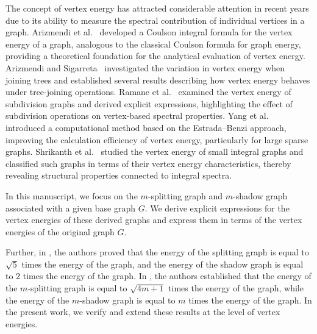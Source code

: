 \documentclass[12pt]{article}
\theoremstyle{plain}
\theoremstyle{remark}
\theoremstyle{definition}
\begin{document}

The concept of vertex energy has attracted considerable attention in recent years due to its ability to measure the spectral contribution of individual vertices in a graph. Arizmendi et al.~\cite{3} developed a Coulson integral formula for the vertex energy of a graph, analogous to the classical Coulson formula for graph energy, providing a theoretical foundation for the analytical evaluation of vertex energy. Arizmendi and Sigarreta~\cite{4} investigated the variation in vertex energy when joining trees and established several results describing how vertex energy behaves under tree-joining operations. Ramane et al.~\cite{5} examined the vertex energy of subdivision graphs and derived explicit expressions, highlighting the effect of subdivision operations on vertex-based spectral properties. Yang et al.~\cite{6} introduced a computational method based on the Estrada--Benzi approach, improving the calculation efficiency of vertex energy, particularly for large sparse graphs. Shrikanth et al.~\cite{7} studied the vertex energy of small integral graphs and classified such graphs in terms of their vertex energy characteristics, thereby revealing structural properties connected to integral spectra.

In this manuscript, we focus on the $m$-splitting graph and $m$-shadow graph associated with a given base graph $G$. We derive explicit expressions for the vertex energies of these derived graphs and express them in terms of the vertex energies of the original graph $G$. 

Further, in \cite{8}, the authors proved that the energy of the splitting graph is equal to $\sqrt{5}$ times the energy of the graph, and the energy of the shadow graph is equal to $2$ times the energy of the graph. In \cite{9}, the authors established that the energy of the $m$-splitting graph is equal to $\sqrt{4m+1}$ times the energy of the graph, while the energy of the $m$-shadow graph is equal to $m$ times the energy of the graph. In the present work, we verify and extend these results at the level of vertex energies.
\end{document}
